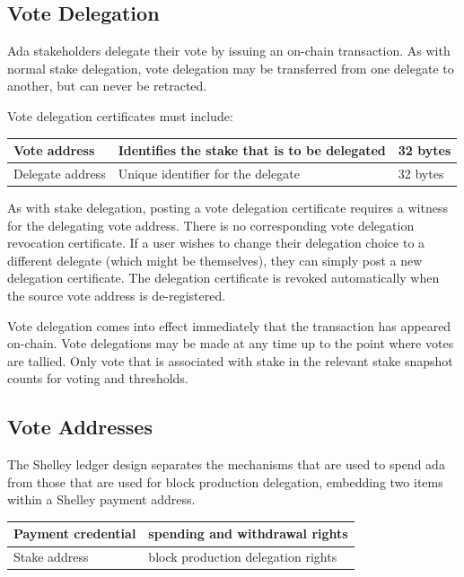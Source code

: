 \subsection{Vote Delegation}

Ada stakeholders delegate their vote by issuing an on-chain transaction.  As with normal stake delegation, vote delegation may be transferred from one delegate to another, but can never be retracted.

Vote delegation certificates must include:

\begin{tabular}{||l|p{3in}|l||}
  \hline\hline
  Vote address & Identifies the stake that is to be delegated  & 32 bytes
  \\\hline
  Delegate address & Unique identifier for the delegate & 32 bytes
  \\\hline
  \hline
\end{tabular}
As with stake delegation, posting a vote delegation certificate requires a witness for the delegating vote address.
There is no corresponding vote delegation revocation certificate. If a user wishes to change their delegation choice to a different delegate (which might be themselves),
they can simply post a new delegation certificate. The delegation certificate is revoked automatically when the source vote address is de-registered.

Vote delegation comes into effect immediately that the transaction has appeared on-chain.  %
Vote delegations may be made at any time up to the point where votes are tallied.
Only vote that is associated with stake in the relevant stake snapshot counts for voting and thresholds.

\subsection{Vote Addresses}

The Shelley ledger design separates the mechanisms that are used to spend ada from those that are used for block production delegation, embedding two items within a Shelley payment address.

\begin{center}
  \begin{tabular}{||l|l||}
  \hline\hline
  Payment credential & spending and withdrawal rights \\\hline
  Stake address & block production delegation rights \\\hline
  \hline
  \end{tabular}
\end{center}

